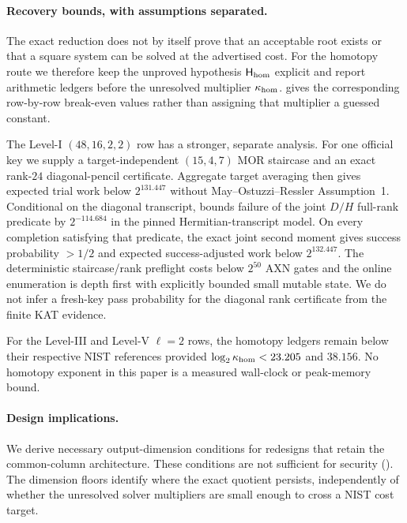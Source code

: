 \documentclass[11pt]{article}
\begin{document}
\paragraph{Recovery bounds, with assumptions separated.}
The exact reduction does not by itself prove that an acceptable root exists or
that a square system can be solved at the advertised cost.  For the homotopy
route we therefore keep the unproved hypothesis $\mathsf H_{\rm hom}$ explicit
and report arithmetic ledgers before the unresolved multiplier
$\kappa_{\rm hom}$.   gives the corresponding row-by-row
break-even values rather than assigning that multiplier a guessed constant.

The Level-I $(48,16,2,2)$ row has a stronger, separate analysis.  For one
official key we supply a target-independent $(15,4,7)$ MOR staircase and an
exact rank-$24$ diagonal-pencil certificate.  Aggregate target averaging then
gives expected trial work below $2^{131.447}$ without
May--Ostuzzi--Ressler Assumption~1.  Conditional on the diagonal transcript,
 bounds failure of the joint $D/H$ full-rank
predicate by $2^{-114.684}$ in the pinned Hermitian-transcript model.  On every
completion satisfying that predicate, the exact joint second moment gives
success probability $>1/2$ and expected success-adjusted work below
$2^{132.447}$.  The deterministic staircase/rank preflight costs below
$2^{50}$ AXN gates and the online enumeration is depth first with explicitly
bounded small mutable state.  We do not infer a fresh-key pass probability for
the diagonal rank certificate from the finite KAT evidence.

For the Level-III and Level-V $\ell=2$ rows, the homotopy ledgers remain below
their respective NIST references provided
$\log_2\kappa_{\rm hom}<23.205$ and $38.156$.  No homotopy exponent in this
paper is a measured wall-clock or peak-memory bound.

\paragraph{Design implications.}
We derive necessary output-dimension conditions for redesigns that retain the
common-column architecture.  These conditions are not sufficient for security
().  The dimension floors identify where the exact quotient persists, independently
of whether the unresolved solver multipliers are small enough to cross a NIST
cost target.
\end{document}
